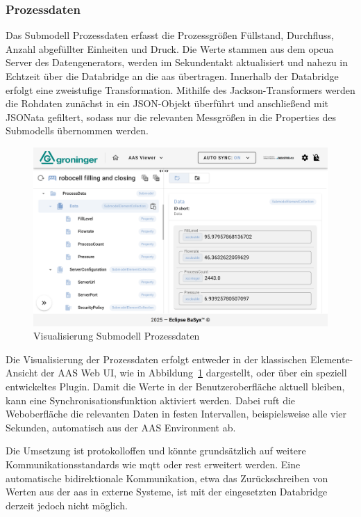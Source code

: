 \subsubsection*{Prozessdaten}
\vspace{-0.5em}
Das Submodell Prozessdaten erfasst die Prozessgrößen Füllstand, Durchfluss, Anzahl abgefüllter Einheiten und Druck.
Die Werte stammen aus dem \acs{opcua} Server des
\linebreak
Datengenerators, werden im Sekundentakt aktualisiert und nahezu in Echtzeit über die Databridge an die \acs{aas} übertragen.
Innerhalb der Databridge erfolgt eine zweistufige Transformation.
Mithilfe des Jackson-Transformers werden die Rohdaten zunächst in ein JSON-Objekt überführt und anschließend mit JSONata gefiltert, sodass nur die relevanten Messgrößen in die Properties des Submodells übernommen werden.

\vspace{0.2em}
\begin{figure}[htbp]
    \centering
    \includegraphics[width=1\textwidth]{Bilder/ErgebnisseAASWebUI/ProcessData.png}
    \caption{Visualisierung Submodell Prozessdaten}
    \label{fig:Processdata}
\end{figure}
\vspace{-0.7em}
Die Visualisierung der Prozessdaten erfolgt entweder in der klassischen Elemente-Ansicht der AAS Web UI, wie in Abbildung~\ref{fig:Processdata} dargestellt, oder über ein speziell entwickeltes Plugin.
Damit die Werte in der Benutzeroberfläche aktuell bleiben, kann eine Synchronisationsfunktion aktiviert werden.
Dabei ruft die Weboberfläche die relevanten Daten in festen Intervallen, beispielsweise alle vier Sekunden, automatisch aus der AAS Environment ab.

Die Umsetzung ist protokolloffen und könnte grundsätzlich auf weitere Kommunikationsstandards wie \acs{mqtt} oder \acs{rest} erweitert werden.
Eine automatische bidirektionale Kommunikation, etwa das Zurückschreiben von Werten aus der \acs{aas} in externe Systeme, ist mit der eingesetzten Databridge derzeit jedoch nicht möglich.

